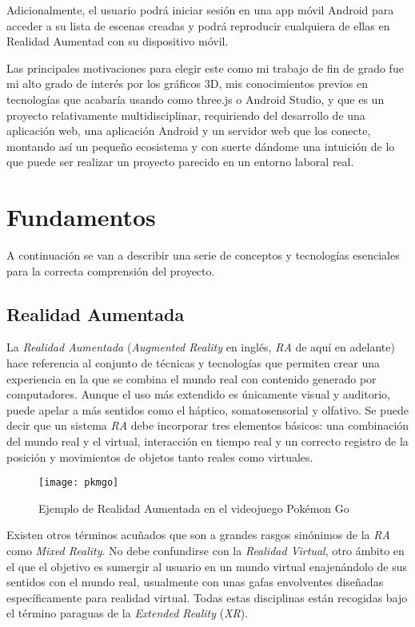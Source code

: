 Adicionalmente, el usuario podrá iniciar sesión en una app móvil Android para acceder a su lista de escenas creadas y podrá reproducir cualquiera de ellas en Realidad Aumentad con su dispositivo móvil.

Las principales motivaciones para elegir este como mi trabajo de fin de grado fue mi alto grado de interés por los gráficos 3D, mis conocimientos previos en tecnologías que acabaría usando como three.js o Android Studio, y que es un proyecto relativamente multidisciplinar, requiriendo del desarrollo de una aplicación web, una aplicación Android y un servidor web que los conecte, montando así un pequeño ecosistema y con suerte dándome una intuición de lo que puede ser realizar un proyecto parecido en un entorno laboral real.

\section{Fundamentos}

A continuación se van a describir una serie de conceptos y tecnologías esenciales para la correcta comprensión del proyecto.

\subsection{Realidad Aumentada}

La \textit{Realidad Aumentada} (\textit{Augmented Reality} en inglés, \textit{RA} de aquí en adelante) hace referencia al conjunto de técnicas y tecnologías que permiten crear una experiencia en la que se combina el mundo real con contenido generado por computadores. Aunque el uso más extendido es únicamente visual y auditorio, puede apelar a más sentidos como el háptico, somatosensorial y olfativo. Se puede decir que un sistema \textit{RA} debe incorporar tres elementos básicos: una combinación del mundo real y el virtual, interacción en tiempo real y un correcto registro de la posición y movimientos de objetos tanto reales como virtuales. 

\begin{figure}[H]
    \centering
    \texttt{[image: pkmgo]}
    \caption[Ejemplo RA]{Ejemplo de Realidad Aumentada en el videojuego Pokémon Go}
\end{figure}

Existen otros términos acuñados que son a grandes rasgos sinónimos de la \textit{RA} como \textit{Mixed Reality}. No debe confundirse con la \textit{Realidad Virtual}, otro ámbito en el que el objetivo es sumergir al usuario en un mundo virtual enajenándolo de sus sentidos con el mundo real, usualmente con unas gafas envolventes diseñadas específicamente para realidad virtual. Todas estas disciplinas están recogidas bajo el término paraguas de la \textit{Extended Reality} (\textit{XR}).

